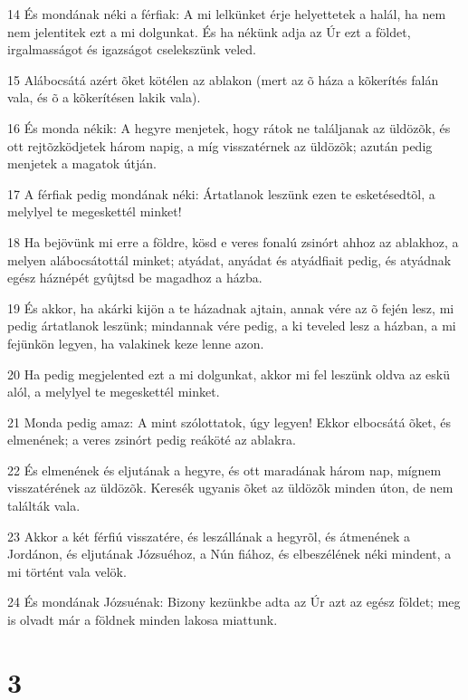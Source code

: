 \par 14 És mondának néki a férfiak: A mi lelkünket érje helyettetek a halál, ha nem nem jelentitek ezt a mi dolgunkat. És ha nékünk adja az Úr ezt a földet, irgalmasságot és igazságot cselekszünk veled.
\par 15 Alábocsátá azért õket kötélen az ablakon (mert az õ háza a kõkerítés falán vala, és õ a kõkerítésen lakik vala).
\par 16 És monda nékik: A hegyre menjetek, hogy rátok ne találjanak az üldözõk, és ott rejtõzködjetek három napig, a míg visszatérnek az üldözõk; azután pedig menjetek a magatok útján.
\par 17 A férfiak pedig mondának néki: Ártatlanok leszünk ezen te esketésedtõl, a melylyel te megeskettél minket!
\par 18 Ha bejövünk mi erre a földre, kösd e veres fonalú zsinórt ahhoz az ablakhoz, a melyen alábocsátottál minket; atyádat, anyádat és atyádfiait pedig, és atyádnak egész háznépét gyûjtsd be magadhoz a házba.
\par 19 És akkor, ha akárki kijön a te házadnak ajtain, annak vére az õ fején lesz, mi pedig ártatlanok leszünk; mindannak vére pedig, a ki teveled lesz a házban, a mi fejünkön legyen, ha valakinek keze lenne azon.
\par 20 Ha pedig megjelented ezt a mi dolgunkat, akkor mi fel leszünk oldva az eskü alól, a melylyel te megeskettél minket.
\par 21 Monda pedig amaz: A mint szólottatok, úgy legyen! Ekkor elbocsátá õket, és elmenének; a veres zsinórt pedig reáköté az ablakra.
\par 22 És elmenének és eljutának a hegyre, és ott maradának három nap, mígnem visszatérének az  üldözõk. Keresék ugyanis õket az üldözõk minden úton, de nem találták vala.
\par 23 Akkor a két férfiú visszatére, és leszállának a hegyrõl, és átmenének a Jordánon, és eljutának Józsuéhoz, a Nún fiához, és elbeszélének néki mindent, a mi történt vala velök.
\par 24 És mondának Józsuénak: Bizony kezünkbe adta az Úr azt az egész földet; meg is olvadt már a földnek minden lakosa miattunk.

\chapter{3}


